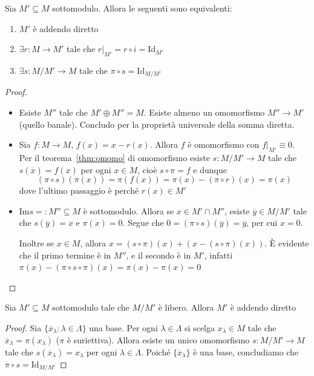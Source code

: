 \begin{proposition}{}
    Sia \(M' \subseteq M \) sottomodulo. Allora le seguenti sono equivalenti:
\begin{enumerate}[label = (\roman*)]
    \item \(M'\) è addendo diretto
    \item \(\exists r : M \to M'\) tale che \(r|_{M'} = r \circ i = \mathrm{Id}_{M'}\) 
    \item \(\exists s : M / M' \to M\) tale che \(\pi \circ s = \mathrm{Id}_{M /
        M'} \) 
\end{enumerate}
\end{proposition}
\begin{proof}{} \(\) 
\begin{itemize}
    \item[\((i) \implies (ii)\)] Esiste \(M''\) tale che \(M' \oplus M'' = M\).
        Esiste almeno un omomorfismo \(M'' \to M'\) (quello banale). Concludo
        per la proprietà universale della somma diretta.
    \item[\({(ii)} \implies {(iii)}\)] Sia \(f : M \to M\), \(f{(x)} = x -
        r{(x)}\). Allora \(f\) è omomorfismo con \(f|_{M'} \equiv 0\). Per il
        teorema~\ref{thm:omomo} di omomorfismo esiste \(s : M / M' \to M\) tale
        che \(s{(\overline{x})} = f{(x)}\) per ogni \(x \in M\), cioè \(s \circ
        \pi = f\) e dunque 
        \[
          {(\pi \circ s)}{(\pi{(x)})} = \pi{(f{(x)})} = \pi{(x)} - {(\pi \circ
          r)}{(x)} = \pi{(x)}
        \]
        dove l'ultimo passaggio è perché \(r{(x)} \in M'\) 
    \item[\((iii) \implies (i)\)] \(\mathrm{Im}s =: M'' \subseteq M\) è
        sottomodulo. Allora se \(x \in M' \cap M''\), esiste \(\overline{y} \in
        M/M'\) tale che \(s{(\overline{y})} = x\) e \(\pi{(x)} = 0\). Segue che
        \(0 = {(\pi \circ s)}{(\overline{y})} = \overline{y}\), per cui \(x =
        0\).

        Inoltre se \(x \in M\), allora \(x = {(s \circ \pi)}{(x)} + {(x - {(s
        \circ \pi)}{(x)})}\). È evidente che il primo termine è in \(M''\), e il
        secondo è in \(M'\), infatti
        \(
          \pi{(x)} - {(\pi \circ s \circ \pi)}{(x)} = \pi{(x)} - \pi{(x)} = 0
        \)
\end{itemize}
\end{proof}

\begin{corollary}{}
    Sia \(M' \subseteq M \) sottomodulo tale che \(M / M'\) è libero. Allora
    \(M'\) è addendo diretto
\end{corollary}
\begin{proof}{}
    Sia \(\{\overline{x}_\lambda : \lambda \in \Lambda\} \) una base. Per ogni \(\lambda
    \in \Lambda\) si scelga \(x_\lambda \in M\) tale che \(\overline{x}_\lambda =
    \pi{(x_\lambda)}\) (\(\pi\) è suriettiva). Allora esiste un unico
    omomorfismo \(s : M / M' \to M\) tale che \(s{(\overline{x}_\lambda)} =
    x_\lambda\) per ogni \(\lambda \in \Lambda\). Poiché
    \(\{\overline{x}_\lambda\} \) è una base, concludiamo che \(\pi \circ s =
    \mathrm{Id}_{M / M'} \) 
\end{proof}

